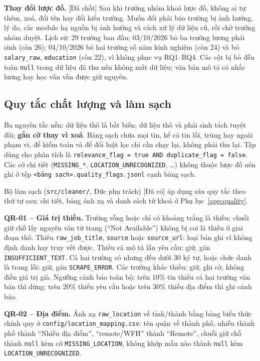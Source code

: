 \documentclass[12pt]{article}
\newcommand{\code}[1]{\texttt{#1}}
\newcommand{\dacoi}{\textsf{[Đã có]}}
\newcommand{\dachot}{\textsf{[Đã chốt]}}
\begin{document}
\textbf{Thay đổi lược đồ.} \dachot{} Sau khi trưởng nhóm khoá lược đồ, không ai tự thêm, xoá, đổi tên hay đổi kiểu trường. Muốn đổi phải báo trường bị ảnh hưởng, lý do, các module hạ nguồn bị ảnh hưởng và cách xử lý dữ liệu cũ, rồi chờ trưởng nhóm duyệt. Lịch sử: 29 trường ban đầu; 03/10/2026 bỏ ba trường lương phái sinh (còn 26); 04/10/2026 bỏ hai trường số năm kinh nghiệm (còn 24) và bỏ \code{salary\_raw}, \code{education} (còn 22), vì không phục vụ RQ1--RQ4. Các cột bị bỏ đều toàn \code{null} trong dữ liệu đã thu nên không mất dữ liệu; văn bản mô tả có nhắc lương hay học vấn vẫn được giữ nguyên.

\subsection{Quy tắc chất lượng và làm sạch}
\label{sec:cleaning}

Ba nguyên tắc nền: dữ liệu thô là bất biến; dữ liệu thô và phái sinh tách tuyệt đối; \textbf{gắn cờ thay vì xoá}. Bảng sạch chứa mọi tin, kể cả tin lỗi, trùng hay ngoài phạm vi, để kiểm toán và để đổi luật lọc chỉ cần chạy lại, không phải thu lại. Tập dùng cho phân tích là \code{relevance\_flag = true AND duplicate\_flag = false}. Các cờ chi tiết (\code{MISSING\_*}, \code{LOCATION\_UNRECOGNIZED}, \dots) không thuộc lược đồ nên ghi ở tệp \code{<bảng sạch>.quality\_flags.jsonl} cạnh bảng sạch.

Bộ làm sạch (\code{src/cleaner/}, Đức phụ trách) \dacoi{} áp dụng sáu quy tắc theo thứ tự sau; chi tiết, bảng ánh xạ và danh sách từ khoá ở Phụ lục~\ref{app:quality}.

\textbf{QR-01 -- Giá trị thiếu.} Trường rỗng hoặc chỉ có khoảng trắng là thiếu; chuỗi giữ chỗ lấy nguyên văn từ trang (``Not Available'') không bị coi là thiếu ở giai đoạn thô. Thiếu \code{raw\_job\_title}, \code{source} hoặc \code{source\_url}: loại bản ghi vì không định danh hay truy vết được. Thiếu cả mô tả lẫn yêu cầu: giữ, gán \code{INSUFFICIENT\_TEXT}. Cả hai trường có nhưng đều dưới 30 ký tự, hoặc chức danh là trang lỗi: giữ, gán \code{SCRAPE\_ERROR}. Các trường khác thiếu: giữ, ghi cờ, không điền giá trị giả. Ngưỡng cảnh báo toàn bộ: trên 10\% tin thiếu cả hai trường văn bản thì dừng; trên 20\% thiếu yêu cầu hoặc trên 30\% thiếu địa điểm thì ghi cảnh báo.

\textbf{QR-02 -- Địa điểm.} Ánh xạ \code{raw\_location} về tỉnh/thành bằng bảng biểu thức chính quy ở \code{config/location\_mapping.csv}: tên quận về thành phố, nhiều thành phố thành ``Nhiều địa điểm'', ``remote/WFH'' thành ``Remote'', chuỗi giữ chỗ thành \code{null} kèm cờ \code{MISSING\_LOCATION}, không khớp mẫu nào thành \code{null} kèm \code{LOCATION\_UNRECOGNIZED}.
\end{document}
